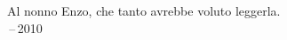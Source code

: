 \thispagestyle{empty}
{}

\vspace*{3cm}

\begin{center}
    Al nonno Enzo, che tanto avrebbe voluto leggerla. \\ \,--\,2010
\end{center}
